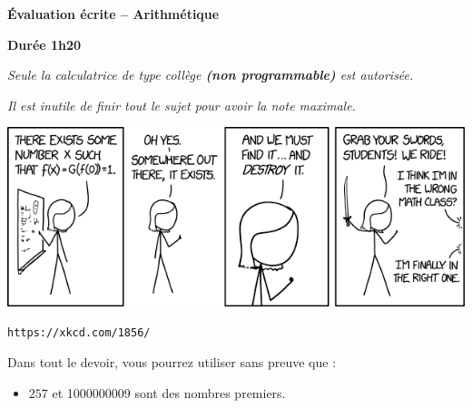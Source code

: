 \documentclass[12pt,a4paper]{article}
\begin{document}
\thispagestyle{empty}


\bigskip

\begin{center}

   {\Large \textbf{Évaluation écrite -- Arithmétique}}
   
   \medskip

   {\Large \textbf{Durée 1h20}}
   
   \medskip
   
   \emph{Seule la calculatrice de type collège \textbf{(non programmable)} est autorisée.}
   
   
   \medskip
   
   \emph{Il est inutile de finir tout le sujet pour avoir la note maximale.}
   
  

\end{center}



\includegraphics[scale=0.7]{exi}

\texttt{https://xkcd.com/1856/}


\pagebreak





  Dans tout le devoir, vous pourrez utiliser sans preuve que :
\begin{itemize}
\item   $257$ et \num{1000000009} sont des nombres premiers.

\end{itemize}  
 

\end{document}
